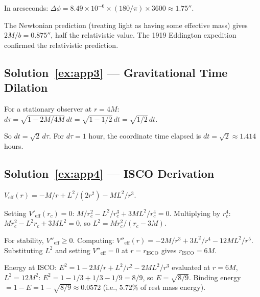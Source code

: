 \documentclass[12pt]{article}
\theoremstyle{definition}
\theoremstyle{remark}
\begin{document}
In arcseconds: $\Delta\phi = 8.49 \times 10^{-6} \times (180/\pi) \times 3600
\approx 1.75''$.

The Newtonian prediction (treating light as having some effective mass) gives
$2M/b = 0.875''$, half the relativistic value. The 1919 Eddington expedition
confirmed the relativistic prediction.

\subsection*{Solution~\ref{ex:app3} --- Gravitational Time Dilation}

For a stationary observer at $r = 4M$: $d\tau = \sqrt{1 - 2M/4M}\,dt = \sqrt{1 - 1/2}\,dt = \sqrt{1/2}\,dt$.

So $dt = \sqrt{2}\,d\tau$. For $d\tau = 1$ hour, the coordinate time elapsed is
$dt = \sqrt{2} \approx 1.414$ hours.

\subsection*{Solution~\ref{ex:app4} --- ISCO Derivation}

$V_{\text{eff}}(r) = -M/r + L^{2}/(2r^{2}) - ML^{2}/r^{3}$.

Setting $V'_{\text{eff}}(r_{c}) = 0$: $M/r_{c}^{2} - L^{2}/r_{c}^{3} + 3ML^{2}/r_{c}^{4} = 0$.
Multiplying by $r_{c}^{4}$: $Mr_{c}^{2} - L^{2}r_{c} + 3ML^{2} = 0$, so
$L^{2} = Mr_{c}^{2}/(r_{c} - 3M)$.

For stability, $V''_{\text{eff}} \geq 0$. Computing:
$V''_{\text{eff}}(r) = -2M/r^{3} + 3L^{2}/r^{4} - 12ML^{2}/r^{5}$.
Substituting $L^{2}$ and setting $V''_{\text{eff}} = 0$ at $r = r_{\text{ISCO}}$ gives
$r_{\text{ISCO}} = 6M$.

Energy at ISCO: $E^{2} = 1 - 2M/r + L^{2}/r^{2} - 2ML^{2}/r^{3}$ evaluated at $r = 6M$, $L^{2} = 12M^{2}$:
$E^{2} = 1 - 1/3 + 1/3 - 1/9 = 8/9$, so $E = \sqrt{8/9}$.
Binding energy $= 1 - E = 1 - \sqrt{8/9} \approx 0.0572$ (i.e., $5.72\%$ of rest mass energy).
\end{document}
